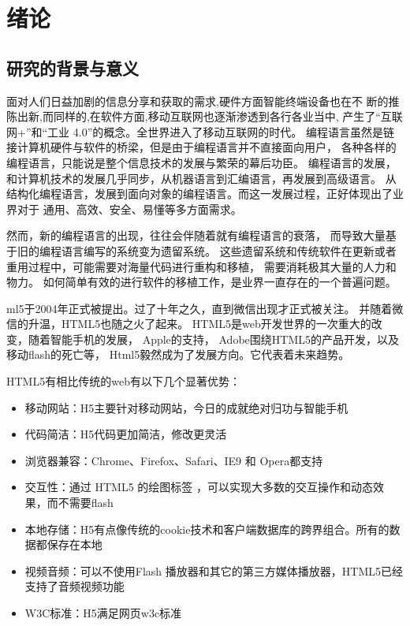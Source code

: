 \chapter{绪论}

\section{研究的背景与意义}

面对人们日益加剧的信息分享和获取的需求,硬件方面智能终端设备也在不
断的推陈出新,而同样的,在软件方面,移动互联网也逐渐渗透到各行各业当中, 
产生了“互联网+”和“工业 4.0”的概念。全世界进入了移动互联网的时代。
编程语言虽然是链接计算机硬件与软件的桥梁，但是由于编程语言并不直接面向用户，
各种各样的编程语言，只能说是整个信息技术的发展与繁荣的幕后功臣。
编程语言的发展，和计算机技术的发展几乎同步，从机器语言到汇编语言，再发展到高级语言。
从结构化编程语言，发展到面向对象的编程语言。而这一发展过程，正好体现出了业界对于
通用、高效、安全、易懂等多方面需求。

然而，新的编程语言的出现，往往会伴随着就有编程语言的衰落，
而导致大量基于旧的编程语言编写的系统变为遗留系统。
这些遗留系统和传统软件在更新或者重用过程中，可能需要对海量代码进行重构和移植，
需要消耗极其大量的人力和物力。
如何简单有效的进行软件的移植工作，是业界一直存在的一个普遍问题。

ml5于2004年正式被提出。过了十年之久，直到微信出现才正式被关注。
并随着微信的升温，HTML5也随之火了起来。
HTML5是web开发世界的一次重大的改变，随着智能手机的发展， 
Apple的支持， Adobe围绕HTML5的产品开发，以及移动flash的死亡等，
Html5毅然成为了发展方向。它代表着未来趋势。

HTML5有相比传统的web有以下几个显著优势：

\begin{itemize}
    \item {\heiti 移动网站：}H5主要针对移动网站，今日的成就绝对归功与智能手机
    \item {\heiti 代码简洁：}H5代码更加简洁，修改更灵活
    \item {\heiti 浏览器兼容：}Chrome、Firefox、Safari、IE9 和 Opera都支持 
    \item {\heiti 交互性：}通过 HTML5 的绘图标签 ，可以实现大多数的交互操作和动态效果，而不需要flash
    \item {\heiti 本地存储：}H5有点像传统的cookie技术和客户端数据库的跨界组合。所有的数据都保存在本地
    \item {\heiti 视频音频：}可以不使用Flash 播放器和其它的第三方媒体播放器，HTML5已经支持了音频视频功能
    \item {\heiti W3C标准：}H5满足网页w3c标准
\end{itemize}



